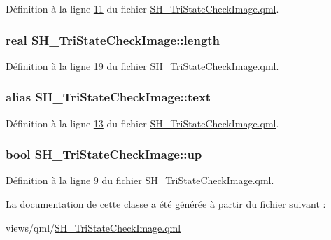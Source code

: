 Définition à la ligne \hyperlink{SH__TriStateCheckImage_8qml_source_l00011}{11} du fichier \hyperlink{SH__TriStateCheckImage_8qml_source}{S\-H\-\_\-\-Tri\-State\-Check\-Image.\-qml}.

\hypertarget{classSH__TriStateCheckImage_aa4fa21a8c9124188a7ea87b4a922c617}{
\subsubsection[{length}]{\setlength{\rightskip}{0pt plus 5cm}real S\-H\-\_\-\-Tri\-State\-Check\-Image\-::length}}\label{classSH__TriStateCheckImage_aa4fa21a8c9124188a7ea87b4a922c617}


Définition à la ligne \hyperlink{SH__TriStateCheckImage_8qml_source_l00019}{19} du fichier \hyperlink{SH__TriStateCheckImage_8qml_source}{S\-H\-\_\-\-Tri\-State\-Check\-Image.\-qml}.

\hypertarget{classSH__TriStateCheckImage_af1e4845c499b61447425538898cf9dbb}{
\subsubsection[{text}]{\setlength{\rightskip}{0pt plus 5cm}alias S\-H\-\_\-\-Tri\-State\-Check\-Image\-::text}}\label{classSH__TriStateCheckImage_af1e4845c499b61447425538898cf9dbb}


Définition à la ligne \hyperlink{SH__TriStateCheckImage_8qml_source_l00013}{13} du fichier \hyperlink{SH__TriStateCheckImage_8qml_source}{S\-H\-\_\-\-Tri\-State\-Check\-Image.\-qml}.

\hypertarget{classSH__TriStateCheckImage_a8a6a37f71149d3f918f642fa9d3e432c}{
\subsubsection[{up}]{\setlength{\rightskip}{0pt plus 5cm}bool S\-H\-\_\-\-Tri\-State\-Check\-Image\-::up}}\label{classSH__TriStateCheckImage_a8a6a37f71149d3f918f642fa9d3e432c}


Définition à la ligne \hyperlink{SH__TriStateCheckImage_8qml_source_l00009}{9} du fichier \hyperlink{SH__TriStateCheckImage_8qml_source}{S\-H\-\_\-\-Tri\-State\-Check\-Image.\-qml}.



La documentation de cette classe a été générée à partir du fichier suivant \-:\begin{DoxyCompactItemize}
\item 
views/qml/\hyperlink{SH__TriStateCheckImage_8qml}{S\-H\-\_\-\-Tri\-State\-Check\-Image.\-qml}\end{DoxyCompactItemize}
